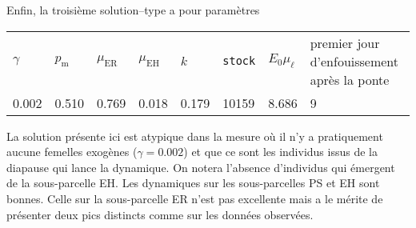 Enfin, la troisième solution--type a pour paramètres
\begin{center}
\small
\begin{tabular}{llllllll}
$\gamma$ & $p_{\text{m}}$ & $\mu_{\text{ER}}$ & $\mu_{\text{EH}}$ & $k$ & \texttt{stock} & $E_0\mu_\ell$ & premier jour d'enfouissement après la ponte\\
0.002 & 0.510 & 0.769 & 0.018 & 0.179 & 10159 & 8.686 & 9
 \end{tabular}
\end{center}
La solution présente ici est atypique dans la mesure où il n'y a pratiquement aucune femelles exogènes ($\gamma = 0.002$) et que ce sont les individus issus de la diapause qui lance la dynamique.
On notera l'absence d'individus qui émergent de la sous-parcelle EH.
Les dynamiques sur les sous-parcelles PS et EH sont bonnes.
Celle sur la sous-parcelle ER n'est pas excellente mais a le mérite de présenter deux pics distincts comme sur les données observées.



% 
% 
